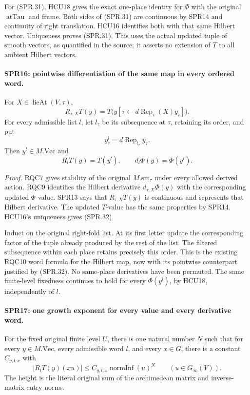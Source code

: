\documentclass[11pt,a4paper]{article}
\numberwithin{equation}{section}
\theoremstyle{remark}\newtheorem{remark}[theorem]{Remark}
\begin{document}
For (SPR.31), HCU18 gives the exact one-place identity for
\(\Phi\) with the original \(\operatorname{atTau}\) and frame.
Both sides of (SPR.31) are continuous by SPR14 and continuity
of right translation.  HCU16 identifies both with that same
Hilbert vector.  Uniqueness proves (SPR.31).
This uses the actual updated tuple of smooth vectors, as
quantified in the source; it asserts no extension of \(T\) to
all ambient Hilbert vectors.

\paragraph{SPR16: pointwise differentiation of the same map in every ordered word.}
\label{claim:SPR16}
For \(X\in\operatorname{lieAt}(V,\tau)\),
\[
 R_{\tau,X}T(y)
   =T\bigl(y[\tau\leftarrow d\operatorname{Rep}_\tau(X)y_\tau]\bigr).
 \tag{SPR.32}
\]
For every admissible list \(l\), let \(l_\tau\) be its subsequence
at \(\tau\), retaining its order, and put
\[
        y^l_\tau=d\operatorname{Rep}_{l_\tau}y_\tau.
\]
Then \(y^l\in M.\mathrm{Vec}\) and
\[
                 R_lT(y)=T(y^l),\qquad
                   d_l\Phi(y)=\Phi(y^l).
 \tag{SPR.33}
\]

\emph{Proof.}
RQC7 gives stability of the original \(M.\mathrm{sm}_\tau\)
under every allowed derived action.
RQC9 identifies the Hilbert derivative
\(d_{\tau,X}\Phi(y)\) with the corresponding updated \(\Phi\)-value.
SPR13 says that \(R_{\tau,X}T(y)\) is continuous and represents
that Hilbert derivative.
The updated \(T\)-value has the same properties by SPR14.
HCU16's uniqueness gives (SPR.32).

Induct on the original right-fold list.
At its first letter update the corresponding factor of the tuple
already produced by the rest of the list.
The filtered subsequence within each place retains precisely this
order.  This is the existing RQC10 word formula for the Hilbert
map, now with its pointwise counterpart justified by (SPR.32).
No same-place derivatives have been permuted.
The same finite-level fixedness continues to hold for every
\(\Phi(y^l)\), by HCU18, independently of \(l\).

\paragraph{SPR17: one growth exponent for every value and every derivative word.}
\label{claim:SPR17}
For the fixed original finite level \(U\), there is one natural
number \(N\) such that for every \(y\in M.\mathrm{Vec}\), every
admissible word \(l\), and every \(x\in G\), there is a constant
\(C_{y,l,x}\) with
\[
              |R_lT(y)(xu)|
                 \le C_{y,l,x}\operatorname{normInf}(u)^N
                       \qquad(u\in G_\infty(V)).
 \tag{SPR.34}
\]
The height is the literal original sum of the archimedean matrix
and inverse-matrix entry norms.
\end{document}
